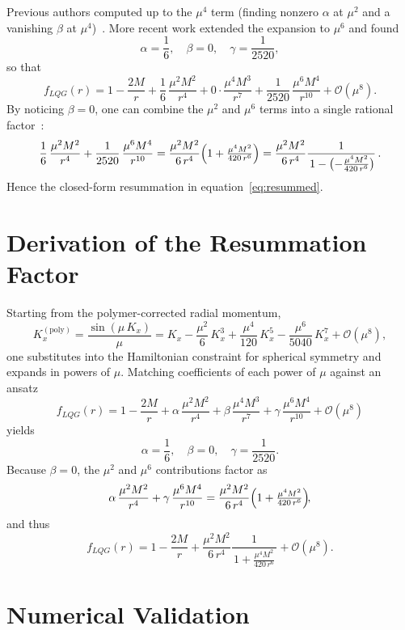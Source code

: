 \documentclass[11pt]{article}
\begin{document}
Previous authors computed up to the $\mu^4$ term (finding nonzero $\alpha$ at $\mu^2$ and a vanishing $\beta$ at $\mu^4$)~\cite{Modesto2006}.  More recent work extended the expansion to $\mu^6$ and found
\[
\alpha = \frac{1}{6}, \quad \beta = 0, \quad \gamma = \frac{1}{2520},
\]
so that
\[
f_{LQG}(r) = 1 - \frac{2M}{r}
+ \frac{1}{6}\,\frac{\mu^{2}M^{2}}{r^{4}}
+ 0 \cdot \frac{\mu^{4}M^{3}}{r^{7}}
+ \frac{1}{2520}\,\frac{\mu^{6}M^{4}}{r^{10}}
+ \mathcal{O}(\mu^{8}).
\]
By noticing $\beta=0$, one can combine the $\mu^2$ and $\mu^6$ terms into a single rational factor~\cite{remumsion2025}:
\begin{equation*}
\frac{1}{6}\,\frac{\mu^{2}M^{2}}{r^{4}}
+ \frac{1}{2520}\,\frac{\mu^{6}M^{4}}{r^{10}}
= \frac{\mu^{2}M^{2}}{6\,r^{4}}
  \Bigl(1 + \tfrac{\mu^{4}M^{2}}{420\,r^{6}}\Bigr)
= \frac{\mu^{2}M^{2}}{6\,r^{4}}
  \frac{1}{\,1 - \bigl(-\tfrac{\mu^{4}M^{2}}{420\,r^{6}}\bigr)}\,.
\end{equation*}
Hence the closed-form resummation in equation~\eqref{eq:resummed}.

\section{Derivation of the Resummation Factor}

Starting from the polymer-corrected radial momentum,
\[
K_x^{(\mathrm{poly})} 
= \frac{\sin(\mu\,K_x)}{\mu}
= K_x - \frac{\mu^2}{6}\,K_x^3 + \frac{\mu^4}{120}\,K_x^5 - \frac{\mu^6}{5040}\,K_x^7 + \mathcal{O}(\mu^8),
\]
one substitutes into the Hamiltonian constraint for spherical symmetry and expands in powers of $\mu$.  Matching coefficients of each power of $\mu$ against an ansatz
\[
f_{LQG}(r)
= 1 - \frac{2M}{r}
+ \alpha\,\frac{\mu^{2}M^{2}}{r^{4}}
+ \beta\,\frac{\mu^{4}M^{3}}{r^{7}}
+ \gamma\,\frac{\mu^{6}M^{4}}{r^{10}}
+ \mathcal{O}(\mu^{8})
\]
yields
\[
\alpha = \frac{1}{6}, 
\quad 
\beta = 0, 
\quad 
\gamma = \frac{1}{2520}.
\]
Because $\beta=0$, the $\mu^2$ and $\mu^6$ contributions factor as
\[
\alpha\,\frac{\mu^{2}M^{2}}{r^{4}}
+ \gamma\,\frac{\mu^{6}M^{4}}{r^{10}}
= \frac{\mu^{2}M^{2}}{6\,r^{4}}
  \Bigl(1 + \tfrac{\mu^{4}M^{2}}{420\,r^{6}}\Bigr)\!,
\]
and thus
\[
f_{LQG}(r)
= 1 - \frac{2M}{r}
+ \frac{\mu^{2}M^{2}}{6\,r^{4}}
  \frac{1}{\,1 + \tfrac{\mu^{4}M^{2}}{420\,r^{6}}\,}
+ \mathcal{O}(\mu^{8}).
\]

\section{Numerical Validation}
\end{document}

